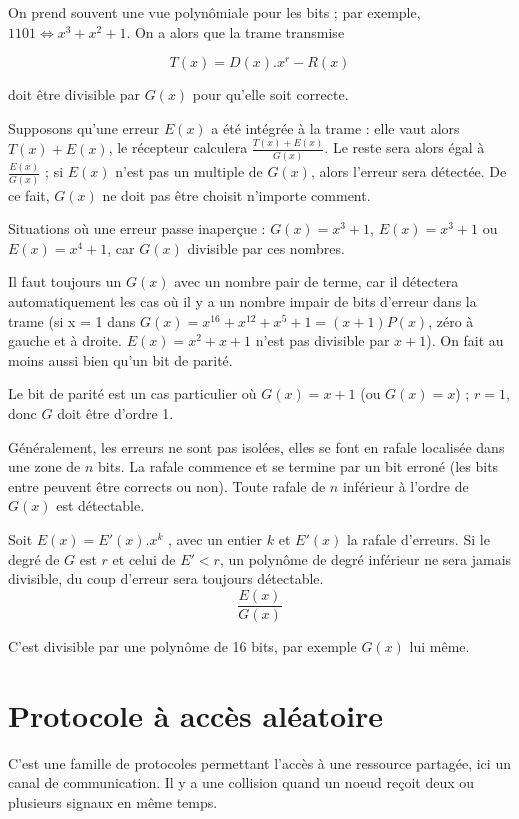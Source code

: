 	On prend souvent une vue polynômiale pour les bits ; par exemple, $1101 \Leftrightarrow x^3 + x^2 + 1$. On a alors que la trame transmise
	
	$$T(x) = D(x) . x^r - R(x)$$
	
	doit être divisible par $G(x)$ pour qu'elle soit correcte.
	
	Supposons qu'une erreur $E(x)$ a été intégrée à la trame : elle vaut alors $T(x) + E(x)$, le récepteur calculera $ \frac{T(x) + E(x)}{G(x)} $. Le reste sera alors égal à $ \frac{E(x)}{G(x)}$ ; si $E(x)$ n'est pas un multiple de $G(x)$, alors l'erreur sera détectée. De ce fait, $G(x)$ ne doit pas être choisit n'importe comment.
	
	Situations où une erreur passe inaperçue : $G(x) = x^3 + 1$, $E(x) = x^3 + 1$ ou $E(x) = x^4 + 1$, car $G(x)$ divisible par ces nombres.
	
	Il faut toujours un $G(x)$ avec un nombre pair de terme, car il détectera automatiquement les cas où il y a un nombre impair de bits d'erreur dans la trame (si x = 1 dans $G(x) = x^{16} + x^{12} + x^5 + 1 = (x + 1) P(x)$, zéro à gauche et à droite. $E(x) = x^2 + x + 1$ n'est pas divisible par $x + 1 $). On fait au moins aussi bien qu'un bit de parité.
	
	Le bit de parité est un cas particulier où $G(x) = x + 1$ (ou $G(x) = x$) ; $r = 1$, donc $G$ doit être d'ordre 1.
	
	Généralement, les erreurs ne sont pas isolées, elles se font en rafale localisée dans une zone de $n$ bits. La rafale commence et se termine par un bit erroné (les bits entre peuvent être corrects ou non). Toute rafale de $n$ inférieur à l'ordre de $G(x)$ est détectable.
	
	
	Soit $E(x) = E'(x) . x^k$ , avec un entier $k$ et $E'(x)$ la rafale d'erreurs. Si le degré de $G$ est $r$ et celui de $E' < r$, un polynôme de degré inférieur ne sera jamais divisible, du coup d'erreur sera toujours détectable.
	$$ \frac{E(x)}{G(x)} $$
	
	C'est divisible par une polynôme de 16 bits, par exemple $G(x)$ lui même.
	

\section{Protocole à accès aléatoire}

C'est une famille de protocoles permettant l'accès à une ressource partagée, ici un canal de communication. Il y a une collision quand un noeud reçoit deux ou plusieurs signaux en même temps.


